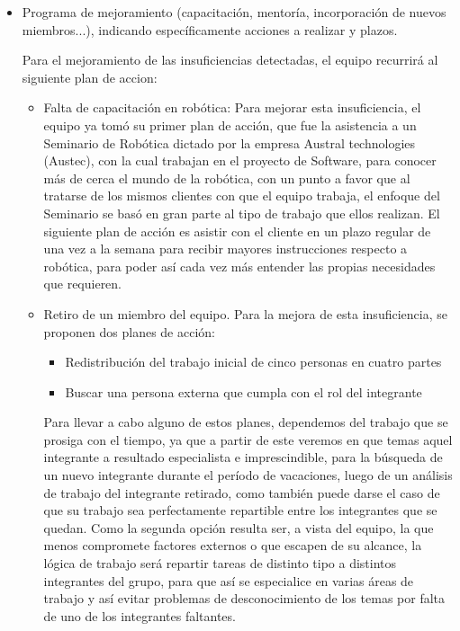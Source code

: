 \documentclass[letterpaper,spanish,10pt]{article}
\begin{document}
\begin{itemize}
        \item Programa de mejoramiento (capacitaci\'on, mentor\'ia, incorporaci\'on de nuevos miembros...), indicando espec\'ificamente acciones a realizar y plazos.

Para el mejoramiento de las insuficiencias detectadas, el equipo recurrir\'a al siguiente plan de accion:

		\begin{itemize}
		\item{Falta de capacitaci\'on en rob\'otica:} Para mejorar esta insuficiencia, el equipo ya tom\'o su primer plan de acci\'on, que fue la asistencia a un Seminario de Rob\'otica dictado por la empresa Austral technologies (Austec), con la cual trabajan en el proyecto de Software, para conocer m\'as de cerca el mundo de la rob\'otica, con un punto a favor que al tratarse de los mismos clientes con que el equipo trabaja, el enfoque del Seminario se bas\'o en gran parte al tipo de trabajo que ellos realizan. El siguiente plan de acci\'on es asistir con el cliente en un plazo regular de una vez a la semana para recibir mayores instrucciones respecto a rob\'otica, para poder as\'i cada vez m\'as entender las propias necesidades que requieren.
		\item{Retiro de un miembro del equipo.} Para la mejora de esta insuficiencia, se proponen dos planes de acci\'on:
			\begin{itemize}
			\item{Redistribuci\'on del trabajo inicial de cinco personas en cuatro partes}
			\item{Buscar una persona externa que cumpla con el rol del integrante}
			\end{itemize}

		Para llevar a cabo alguno de estos planes, dependemos del trabajo que se prosiga con el tiempo, ya que a partir de este veremos en que temas aquel integrante a resultado especialista e imprescindible, para la b\'usqueda de un nuevo integrante durante el per\'iodo de vacaciones, luego de un an\'alisis de trabajo del integrante retirado, como tambi\'en puede darse el caso de que su trabajo sea perfectamente repartible entre los integrantes que se quedan. Como la segunda opci\'on resulta ser, a vista del equipo, la que menos compromete factores externos o que escapen de su alcance, la l\'ogica de trabajo ser\'a repartir tareas de distinto tipo a distintos integrantes del grupo, para que as\'i se especialice en varias \'areas de trabajo y as\'i evitar problemas de desconocimiento de los temas por falta de uno de los integrantes faltantes.
		\end{itemize}



\end{itemize}
\end{document}
